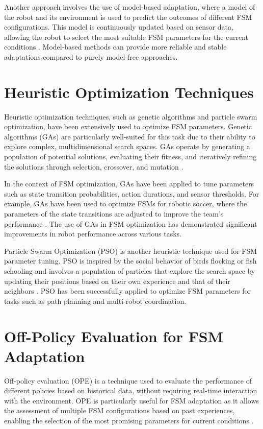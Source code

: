 \documentclass{ULBreport}
\begin{document}
Another approach involves the use of model-based adaptation, where a model of the robot and its environment is used to predict the outcomes of different FSM configurations. This model is continuously updated based on sensor data, allowing the robot to select the most suitable FSM parameters for the current conditions \cite{Kormushev2013}. Model-based methods can provide more reliable and stable adaptations compared to purely model-free approaches.

\section{Heuristic Optimization Techniques}
Heuristic optimization techniques, such as genetic algorithms and particle swarm optimization, have been extensively used to optimize FSM parameters. Genetic algorithms (GAs) are particularly well-suited for this task due to their ability to explore complex, multidimensional search spaces. GAs operate by generating a population of potential solutions, evaluating their fitness, and iteratively refining the solutions through selection, crossover, and mutation \cite{Goldberg1989}.

In the context of FSM optimization, GAs have been applied to tune parameters such as state transition probabilities, action durations, and sensor thresholds. For example, GAs have been used to optimize FSMs for robotic soccer, where the parameters of the state transitions are adjusted to improve the team's performance \cite{Hoffmann2010}. The use of GAs in FSM optimization has demonstrated significant improvements in robot performance across various tasks.

Particle Swarm Optimization (PSO) is another heuristic technique used for FSM parameter tuning. PSO is inspired by the social behavior of birds flocking or fish schooling and involves a population of particles that explore the search space by updating their positions based on their own experience and that of their neighbors \cite{Kennedy1995}. PSO has been successfully applied to optimize FSM parameters for tasks such as path planning and multi-robot coordination.

\section{Off-Policy Evaluation for FSM Adaptation}
Off-policy evaluation (OPE) is a technique used to evaluate the performance of different policies based on historical data, without requiring real-time interaction with the environment. OPE is particularly useful for FSM adaptation as it allows the assessment of multiple FSM configurations based on past experiences, enabling the selection of the most promising parameters for current conditions \cite{Precup2001}.
\end{document}
